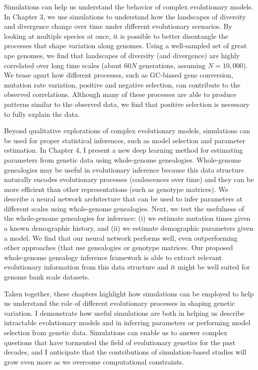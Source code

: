 Simulations can help us understand the behavior of complex evolutionary models.
In Chapter 3, we use simulations to understand how the landscapes of diversity and divergence change over time under different evolutionary scenarios.
By looking at multiple species at once, it is possible to better disentangle the processes that shape variation along genomes.
Using a well-sampled set of great ape genomes, we find that landscapes of diversity (and divergence) are highly correlated over long time scales (about $60N$ generations, assuming $N=10,000$).
We tease apart how different processes, such as GC-biased gene conversion, mutation rate variation, positive and negative selection, can contribute to the observed correlations.
Although many of these processes are able to produce patterns similar to the observed data,
we find that positive selection is necessary to fully explain the data.

Beyond qualitative explorations of complex evolutionary models,
simulations can be used for proper statistical inferences, such as model selection and parameter estimation.
In Chapter 4, I present a new deep learning method for estimating parameters from genetic data using whole-genome genealogies.
Whole-genome genealogies may be useful in evolutionary inference because this data structure naturally encodes evolutionary processes (\eg coalescences over time) and they can be more efficient than other representations (such as genotype matrices).
We describe a neural network architecture that can be used to infer parameters at different scales using whole-genome genealogies.
Next, we test the usefulness of the whole-genome genealogies for inference:
(i) we estimate mutation times given a known demographic history,
and (ii) we estimate demographic parameters given a model.
We find that our neural network performs well, even outperforming other approaches (that use genealogies or genotype matrices.
Our proposed whole-genome genealogy inference framework is able to extract relevant evolutionary information from this data structure and it might be well suited for genome bank scale datasets.

Taken together, these chapters highlight how simulations can be employed to help us understand the role of different evolutionary processes in shaping genetic variation.
I demonstrate how useful simulations are both in helping us describe intractable evolutionary models and in inferring parameters or performing model selection from genetic data.
Simulations can enable us to answer complex questions that have tormented the field of evolutionary genetics for the past decades, 
and I anticipate that the contributions of simulation-based studies will grow even more as we overcome computational constraints.
